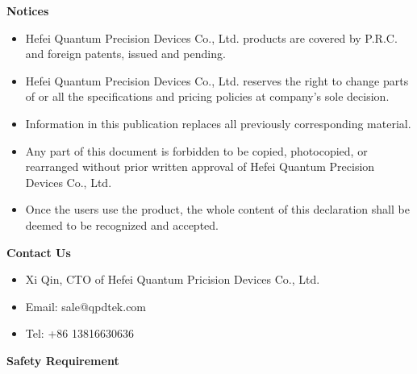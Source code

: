 \vspace{0.8cm}
\sihao\textbf{Notices}
\begin{itemize}
 \item Hefei Quantum Precision Devices Co., Ltd. products are covered by P.R.C. and foreign patents, issued and pending.
 \item Hefei Quantum Precision Devices Co., Ltd. reserves the right to change parts of or all the specifications and pricing policies at company's sole decision.
 \item Information in this publication replaces all previously corresponding material.
 \item Any part of this document is forbidden to be copied, photocopied, or rearranged without prior written approval of Hefei Quantum Precision Devices Co., Ltd.
 \item Once the users use the product, the whole content of this declaration shall be deemed to be recognized and accepted.
\end{itemize}

\vspace{0.6cm}

\sihao\textbf{Contact Us}
\begin{itemize}
 \item Xi Qin, CTO of Hefei Quantum Pricision Devices Co., Ltd.
 \item Email: sale@qpdtek.com
 \item Tel:  +86 13816630636
\end{itemize}


\newpage
\erhao \textbf{Safety Requirement}
\vspace{1.1cm}

